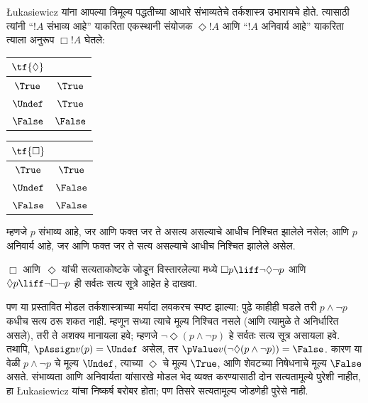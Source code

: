 \documentclass[../../../include/open-logic-section]{subfiles}
\begin{document}
\L ukasiewicz यांना आपल्या त्रिमूल्य पद्धतीच्या आधारे
संभाव्यतेचे तर्कशास्त्र उभारायचे होते. त्यासाठी त्यांनी ``$!A$
संभाव्य आहे'' याकरिता एकस्थानी संयोजक $\Diamond !A$ आणि
``$!A$ अनिवार्य आहे'' याकरिता त्याला अनुरूप $\Box !A$ घेतले:
\begin{center}
  \begin{tabular}{c|c}
    $\tf{\Diamond}$ & \\
    \hline
    $\True$ & $\True$ \\
    $\Undef$ & $\True$ \\
    $\False$ & $\False$
  \end{tabular}
  \quad
  \begin{tabular}{c|c}
    $\tf{\Box}$ & \\
    \hline
    $\True$ & $\True$ \\
    $\Undef$ & $\False$ \\
    $\False$ & $\False$
  \end{tabular}
\end{center}
म्हणजे $p$ संभाव्य आहे, जर आणि फक्त जर ते असत्य असल्याचे
आधीच निश्चित झालेले नसेल; आणि $p$ अनिवार्य आहे, जर आणि
फक्त जर ते सत्य असल्याचे आधीच निश्चित झालेले असेल.

\begin{prob}
  $\Box$ आणि~$\Diamond$ यांची सत्यताकोष्टके जोडून विस्तारलेल्या
  \LogLuk[3] मध्ये $\Box p \liff \lnot\Diamond \lnot p$ आणि
  $\Diamond p \liff \lnot \Box \lnot p$ ही सर्वतः सत्य सूत्रे
  आहेत हे दाखवा.
\end{prob}

पण या प्रस्तावित मोडल तर्कशास्त्राच्या मर्यादा लवकरच स्पष्ट
झाल्या: पुढे काहीही घडले तरी $p \land \lnot p$ कधीच सत्य
ठरू शकत नाही. म्हणून सध्या त्याचे मूल्य निश्चित नसले
(आणि त्यामुळे ते अनिर्धारित असले), तरी ते अशक्य मानायला
हवे; म्हणजे $\lnot \Diamond(p \land \lnot p)$ हे सर्वतः सत्य
सूत्र असायला हवे. तथापि, $\pAssign v(p) = \Undef$ असेल,
तर $\pValue v(\lnot \Diamond(p \land \lnot p)) = \False$.
कारण या वेळी $p \land \lnot p$ चे मूल्य $\Undef$,
त्याच्या $\Diamond$ चे मूल्य $\True$, आणि शेवटच्या निषेधनाचे
मूल्य $\False$ असते.
संभाव्यता आणि अनिवार्यता यांसारखे मोडल भेद व्यक्त करण्यासाठी
दोन सत्यतामूल्ये पुरेशी नाहीत, हा \L ukasiewicz यांचा निष्कर्ष
बरोबर होता; पण तिसरे सत्यतामूल्य जोडणेही पुरेसे नाही.
\end{document}
